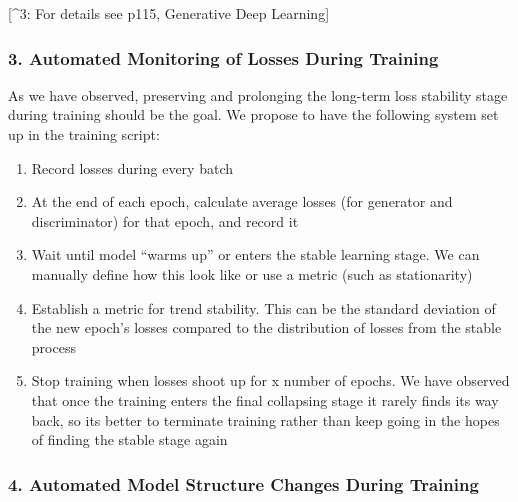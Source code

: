 \documentclass[12pt,oneside]{chicagocapstone}
\providecommand{\tightlist}{%
  \setlength{\itemsep}{0pt}\setlength{\parskip}{0pt}}
\begin{document}
{[}\^{}3: For details see p115, Generative Deep Learning{]}

\hypertarget{automated-monitoring-of-losses-during-training}{%
\subsubsection*{3. Automated Monitoring of Losses During Training}\label{automated-monitoring-of-losses-during-training}}

As we have observed, preserving and prolonging the long-term loss stability stage during training should be the goal. We propose to have the following system set up in the training script:
\begin{enumerate}
\def\labelenumi{\arabic{enumi}.}
\tightlist
\item
  Record losses during every batch
\item
  At the end of each epoch, calculate average losses (for generator and discriminator) for that epoch, and record it
\item
  Wait until model ``warms up'' or enters the stable learning stage. We can manually define how this look like or use a metric (such as stationarity)
\item
  Establish a metric for trend stability. This can be the standard deviation of the new epoch's losses compared to the distribution of losses from the stable process
\item
  Stop training when losses shoot up for x number of epochs. We have observed that once the training enters the final collapsing stage it rarely finds its way back, so its better to terminate training rather than keep going in the hopes of finding the stable stage again
\end{enumerate}
\hypertarget{automated-model-structure-changes-during-training}{%
\subsubsection*{4. Automated Model Structure Changes During Training}\label{automated-model-structure-changes-during-training}}
\end{document}
